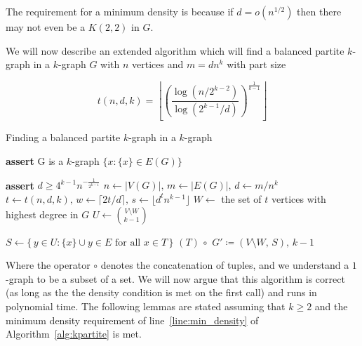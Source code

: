 \begin{remark}
    The requirement for a minimum density is because if $d = o\left(n^{1/2}\right)$ then
    there may not even be a $K(2, 2)$ in $G$. %
\end{remark}

We will now describe an extended algorithm which will find a balanced partite
$k$-graph in a $k$-graph $G$ with
$n$ vertices and $m = d n^k$ with part size

\[
    t (n, d, k) = \left\lfloor
    \left(  \frac{\log (n/2^{k-2})}{\log (2^{k-1}/d)} \right)
    ^{\frac{1}{k-1}} \right\rfloor
\]

\begin{algorithm}
    \caption{Finding a balanced partite $k$-graph in a $k$-graph}
    \label{alg:kpartite}
    \begin{algorithmic}[1]
            \State \textbf{assert} G is a $k$-graph
                \State \Return $\{x : \{x\} \in E(G)\}$
            \EndIf

            \State \textbf{assert} $d \geq 4^{k-1} n^{-\frac{1}{2^{k-1}}}$ \label{line:min_density}
            \State $n \gets |V(G)|,\, m \gets |E(G)|,\, d \gets m/n^k$
            \State $t \gets t(n, d, k),\, w \gets \lceil 2t/d \rceil,\, s \gets \lfloor d^t n^{k-1} \rfloor$ \label{line:tws}
            \State $W \gets$ the set of $t$ vertices with highest degree in $G$ \label{line:W}
            \State $U \gets \binom{V\setminus W}{k-1}$

             \label{line:for}
                \State $S \gets \{\,y \in U : \{x\} \cup y \in E \text{ for all } x \in T\,\}$
                    \State \Return $(T)\, \circ $
                    {$G' \coloneqq (V \setminus W,\, S),\, k-1$} \label{line:return}
                \EndIf
            \EndFor
        \EndFunction
    \end{algorithmic}
\end{algorithm}

Where the operator $\circ$ denotes the concatenation of tuples, and we
understand a $1$-graph to be a subset of a set.
We will now argue that this algorithm is correct
(as long as the the density condition is met on the first call)
and runs in polynomial time.
The following lemmas are stated assuming that $k \geq 2$ and
the minimum density requirement of line~\ref{line:min_density}
of Algorithm~\ref{alg:kpartite} is met.

